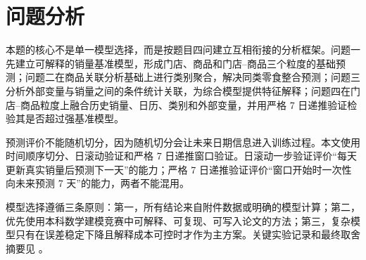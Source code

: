 \section{问题分析}

本题的核心不是单一模型选择，而是按题目四问建立互相衔接的分析框架。问题一先建立可解释的销量基准模型，形成门店、商品和门店--商品三个粒度的基础预测；问题二在商品关联分析基础上进行类别聚合，解决同类零食整合预测；问题三分析外部变量与销量之间的条件统计关联，为综合模型提供特征解释；问题四在门店--商品粒度上融合历史销量、日历、类别和外部变量，并用严格 7 日递推验证检验其是否超过强基准模型。

预测评价不能随机切分，因为随机切分会让未来日期信息进入训练过程。本文使用时间顺序切分、日滚动验证和严格 7 日递推窗口验证。日滚动一步验证评价“每天更新真实销量后预测下一天”的能力；严格 7 日递推验证评价“窗口开始时一次性向未来预测 7 天”的能力，两者不能混用。

模型选择遵循三条原则：第一，所有结论来自附件数据或明确的模型计算；第二，优先使用本科数学建模竞赛中可解释、可复现、可写入论文的方法；第三，复杂模型只有在误差稳定下降且解释成本可控时才作为主方案。关键实验记录和最终取舍摘要见 。
